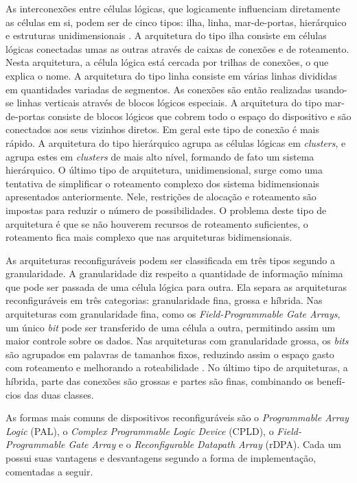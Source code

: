 \documentclass[11pt,a4paper,oneside]{book}
\begin{document}
As interconex\~oes entre c\'elulas l\'ogicas, que logicamente influenciam diretamente as c\'elulas em si, podem ser de cinco tipos: ilha, linha, mar-de-portas, hier\'arquico e estruturas unidimensionais \cite{vassiliadis2007fine}.
A arquitetura do tipo ilha consiste em c\'elulas l\'ogicas conectadas umas as outras atrav\'es de caixas de conex\~oes e de roteamento.
Nesta arquitetura, a c\'elula l\'ogica est\'a cercada por trilhas de conex\~oes, o que explica o nome.
A arquitetura do tipo linha consiste em v\'arias linhas divididas em quantidades variadas de segmentos.
As conex\~oes s\~ao ent\~ao realizadas usando-se linhas verticais atrav\'es de blocos l\'ogicos especiais.
A arquitetura do tipo mar-de-portas consiste de blocos l\'ogicos que cobrem todo o espa\c{c}o do dispositivo e s\~ao conectados aos seus vizinhos diretos.
Em geral este tipo de conex\~ao \'e mais r\'apido.
A arquitetura do tipo hier\'arquico agrupa as c\'elulas l\'ogicas em \textit{clusters}, e agrupa estes em \textit{clusters} de mais alto n\'i­vel, formando de fato um sistema hier\'arquico.
O \'ultimo tipo de arquitetura, unidimensional, surge como uma tentativa de simplificar o roteamento complexo dos sistema bidimensionais apresentados anteriormente.
Nele, restri\c{c}\~oes de aloca\c{c}\~ao e roteamento s\~ao impostas para reduzir o n\'umero de possibilidades.
O problema deste tipo de arquitetura \'e que se n\~ao houverem recursos de roteamento suficientes, o roteamento fica mais complexo que nas arquiteturas bidimensionais.

As arquiteturas reconfigur\'aveis podem ser classificada em tr\^es tipos segundo a granularidade.
A granularidade diz respeito a quantidade de informa\c{c}\~ao m\'i­nima que pode ser passada de uma c\'elula l\'ogica para outra.
Ela separa as arquiteturas reconfigur\'aveis em tr\^es categorias: granularidade fina, grossa e h\'i­brida.
Nas arquiteturas com granularidade fina, como os \textit{Field-Programmable Gate Arrays}, um \'unico \textit{bit} pode ser transferido de uma c\'elula a outra, permitindo assim um maior controle sobre os dados.
Nas arquiteturas com granularidade grossa, os \textit{bits} s\~ao agrupados em palavras de tamanhos fixos, reduzindo assim o espa\c{c}o gasto com roteamento e melhorando a roteabilidade \cite{Hartenstein2001}.
No \'ultimo tipo de arquiteturas, a h\'i­brida, parte das conex\~oes s\~ao grossas e partes s\~ao finas, combinando os benef\'i­cios das duas classes.

As formas mais comuns de dispositivos reconfigur\'aveis s\~ao o \textit{Programmable Array Logic} (PAL), o \textit{Complex Programmable Logic Device} (CPLD), o \textit{Field-Programmable Gate Array} e o \textit{Reconfigurable Datapath Array} (rDPA).
Cada um possui suas vantagens e desvantagens segundo a forma de implementa\c{c}\~ao, comentadas a seguir.
\end{document}
